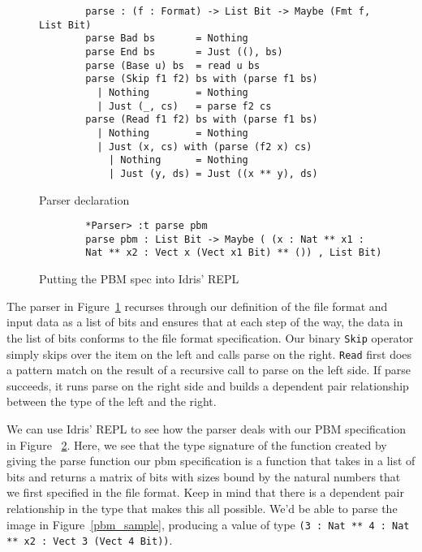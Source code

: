 \begin{figure}[ht!!!!!]
    \caption{Parser declaration \protect\cite{power_of_pi}}
    \label{parser}
    \begin{lstlisting}
        parse : (f : Format) -> List Bit -> Maybe (Fmt f, List Bit)
        parse Bad bs       = Nothing
        parse End bs       = Just ((), bs)
        parse (Base u) bs  = read u bs
        parse (Skip f1 f2) bs with (parse f1 bs)
          | Nothing        = Nothing
          | Just (_, cs)   = parse f2 cs
        parse (Read f1 f2) bs with (parse f1 bs)
          | Nothing        = Nothing
          | Just (x, cs) with (parse (f2 x) cs)
            | Nothing      = Nothing
            | Just (y, ds) = Just ((x ** y), ds)
    \end{lstlisting}
\end{figure}

\begin{figure}[ht]
    \caption{Putting the PBM spec into Idris' REPL}
    \label{repl}
    \begin{lstlisting}
        *Parser> :t parse pbm 
        parse pbm : List Bit -> Maybe ( (x : Nat ** x1 :
        Nat ** x2 : Vect x (Vect x1 Bit) ** ()) , List Bit)
    \end{lstlisting}
\end{figure}

The parser in Figure~\ref{parser} recurses through our definition of the file
format and input data as a list of bits and ensures that at each step of the
way, the data in the list of bits conforms to the file format specification. Our
binary \texttt{Skip} operator simply skips over the item on the left and calls
parse on the right. \texttt{Read} first does a pattern match on the result of
a recursive call to parse on the left side. If parse succeeds, it runs parse
on the right side and builds a dependent pair relationship between the type
of the left and the right. 

We can use Idris' REPL to see how the parser deals with our PBM specification in
Figure ~\ref{repl}. Here, we see that the type signature of the function created
by giving the parse function our pbm specification is a function that takes in a
list of bits and returns a matrix of bits with sizes bound by the natural
numbers that we first specified in the file format. Keep in mind that there is a
dependent pair relationship in the type that makes this all possible. We'd be
able to parse the image in Figure~\ref{pbm_sample}, producing a value of type
\texttt{(3 : Nat ** 4 : Nat ** x2 : Vect 3 (Vect 4 Bit))}. 

